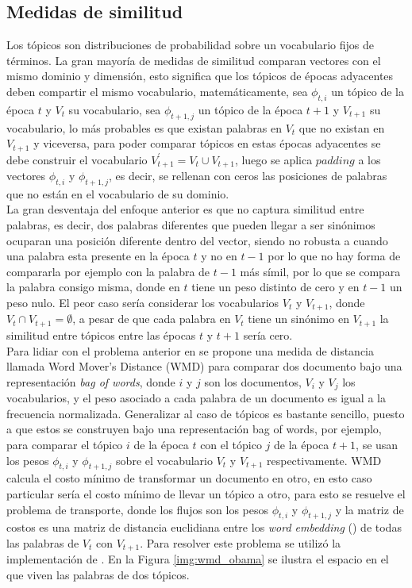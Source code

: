 \documentclass[letterpaper,12pt,oneside]{book} %
\begin{document}
\subsection{Medidas de similitud}
Los tópicos son distribuciones de probabilidad sobre un vocabulario fijos de términos. La gran mayoría de medidas de similitud comparan vectores con el mismo dominio y dimensión, esto significa que los tópicos de épocas adyacentes deben compartir el mismo vocabulario, matemáticamente, sea $\phi_{t, i}$ un tópico de la época $t$ y $V_{t}$ su vocabulario, sea  $\phi_{t+1, j}$ un tópico de la época $t+1$ y $V_{t+1}$ su vocabulario, lo más probables es que existan palabras en $V_{t}$ que no existan en $V_{t+1}$ y viceversa, para poder comparar tópicos en estas épocas adyacentes se debe construir el vocabulario $V_{t+1}^{'}=V_{t}\cup V_{t+1}$, luego se aplica $padding$ a los vectores $\phi_{t, i}$ y $\phi_{t+1, j}$, es decir, se rellenan con ceros las posiciones de palabras que no están en el vocabulario de su dominio.\\

La gran desventaja del enfoque anterior es que no captura similitud entre palabras, es decir, dos palabras diferentes que pueden llegar a ser sinónimos ocuparan una posición diferente dentro del vector, siendo no robusta a cuando una palabra esta presente en la época $t$ y no en $t-1$ por lo que no hay forma de compararla por ejemplo con la palabra de $t-1$ más símil, por lo que se compara la palabra consigo misma, donde en $t$ tiene un peso distinto de cero y en $t-1$ un peso nulo. El peor caso sería considerar los vocabularios $V_{t}$ y $V_{t+1}$, donde $V_{t}\cap V_{t+1} =  \emptyset$, a pesar de que cada palabra en $V_{t}$ tiene un sinónimo en $V_{t+1}$ la similitud entre tópicos entre las épocas $t$ y $t+1$ sería cero.\\

Para lidiar con el problema anterior en \citep{kusner2015word} se propone una medida de distancia llamada Word Mover's Distance (WMD) para comparar dos documento bajo una representación \textit{bag of words}, donde $i$ y $j$ son los documentos, $V_{i}$ y $V_{j}$ los vocabularios, y el peso asociado a cada palabra de un documento  es igual a la frecuencia normalizada. Generalizar al caso de tópicos es bastante sencillo, puesto a que estos se construyen bajo una representación bag of words, por ejemplo, para comparar el tópico $i$ de la época $t$ con el tópico $j$ de la época $t+1$, se usan los pesos $\phi_{t,i}$ y $\phi_{t+1,j}$ sobre el vocabulario $V_{t}$ y $V_{t+1}$ respectivamente. WMD calcula el costo mínimo de transformar un documento en otro, en esto caso particular sería el costo mínimo de llevar un tópico a otro, para esto se resuelve el problema de transporte, donde los flujos son los pesos $\phi_{t,i}$ y $\phi_{t+1,j}$ y la matriz de costos es una matriz de distancia euclidiana entre los \textit{word embedding} (\cite{mikolov2013distributed}) de todas las palabras de $V_{t}$ con $V_{t+1}$. Para resolver este problema se utilizó la implementación de \citep{PyEMD}. En la Figura \ref{img:wmd_obama} se ilustra el espacio en el que viven las palabras de dos tópicos.
\end{document}
